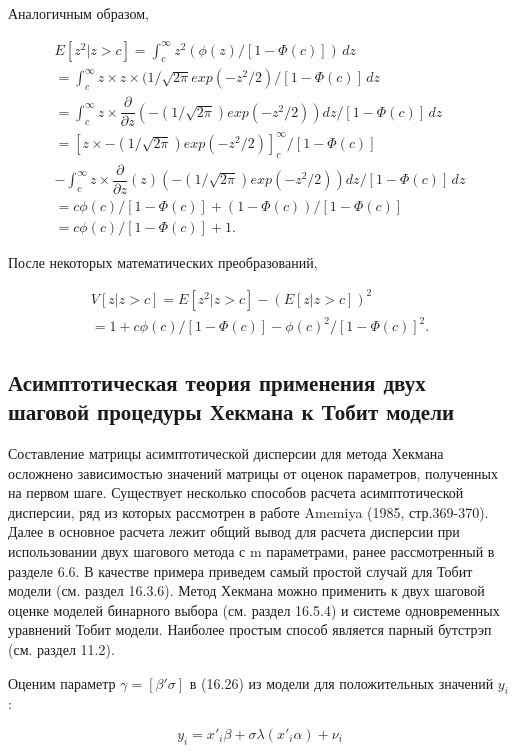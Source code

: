 Аналогичным образом, 

\begin{multline}
E[z^2|z>c]=\int_c^{\infty}z^2(\phi(z)/[1-\Phi(c)])\,dz \\
=\int_c^{\infty} z{\times}z \times (1/\sqrt{2\pi}exp(-z^2/2)/[1-\Phi(c)]\,dz \\
=\int_c^{\infty}z{\times}\dfrac{\partial}{\partial{z}}\left(-(1/\sqrt{2\pi})exp(-z^2/2)\right)dz/[1-\Phi(c)]\,dz \\
=\left[z{\times}-(1/\sqrt{2\pi})exp(-z^2/2)\right]_c^{\infty}/[1-\Phi(c)] \\
-\int_c^{\infty}z{\times}\dfrac{\partial}{\partial{z}}(z)\left(-(1/\sqrt{2\pi})exp(-z^2/2)\right)dz/[1-\Phi(c)]\,dz\\
=c\phi(c)/[1-\Phi(c)]+(1-\Phi(c))/[1-\Phi(c)] \\
=c\phi(c)/[1-\Phi(c)]+1.
\end{multline}

После некоторых математических преобразований, 


\begin{align}
V[z|z>c]=E[z^2|z>c]-(E[z|z>c])^2 \\
=1+c\phi(c)/[1-\Phi(c)]-\phi(c)^2/[1-\Phi(c)]^{2}.
\end{align}



\subsection{Асимптотическая теория применения двух шаговой процедуры Хекмана к Тобит модели}

Составление матрицы асимптотической дисперсии для метода Хекмана осложнено зависимостью значений матрицы от оценок параметров, полученных на первом шаге. Существует несколько способов расчета асимптотической дисперсии, ряд из которых рассмотрен в работе Amemiya (1985, стр.369-370). Далее в основное расчета лежит общий вывод для расчета дисперсии при использовании двух шагового метода с m параметрами, ранее рассмотренный в разделе 6.6. В качестве примера приведем самый простой случай для Тобит модели (см. раздел 16.3.6). Метод Хекмана можно применить к двух шаговой оценке моделей бинарного выбора (см. раздел 16.5.4) и системе одновременных уравнений Тобит модели. Наиболее простым способ является парный бутстрэп (см. раздел 11.2).

Оценим параметр $\gamma=[\beta'\sigma]$ в (16.26) из модели для положительных значений $y_i$:

\[
y_i=x'_{i}\beta+\sigma\lambda(x'_{i}\alpha)+\nu_i
\]

